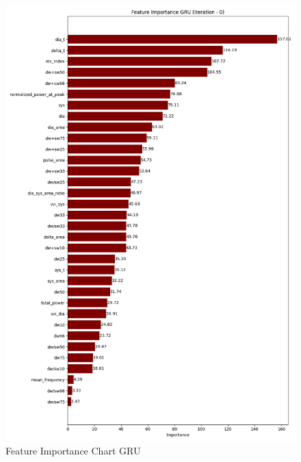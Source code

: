 \begin{figure}[h]
    \centering
    \vspace{-1cm}
    \hspace{-2cm}
    \includegraphics[width=\textwidth]{images/results/feature_importance/feature_importance_plot_GRU_0}
    \caption{Feature Importance Chart GRU}
    \label{fig:fi_gru}
\end{figure}

